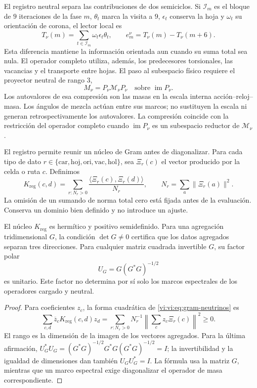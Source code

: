 El registro neutral separa las contribuciones de dos semiciclos. Si
\(\mathcal I_m\) es el bloque de \(9\) iteraciones de la fase \(m\),
\(\theta_t\) marca la visita a \(9\), \(\epsilon_t\) conserva la hoja
y \(\omega_t\) su orientación de corona, el lector local es
\[
 T_\nu(m)=\sum_{t\in\mathcal I_m}\omega_t\epsilon_t\theta_t,
 \qquad e_m^\nu=T_\nu(m)-T_\nu(m+6).
\]
Esta diferencia mantiene la información orientada aun cuando su suma
total sea nula. El operador completo utiliza, además, los predecesores
torsionales, las vacancias y el transporte entre hojas. El paso al
subespacio físico requiere el proyector neutral de rango \(3\),
\[
 M_\nu=P_\nu\mathcal M_\nu P_\nu
 \quad\text{sobre }\operatorname{im}P_\nu.
\]
Los autovalores de esa compresión son las masas en la escala interna
acción--reloj--masa. Los ángulos de mezcla actúan entre sus marcos;
no sustituyen la escala ni generan retrospectivamente los autovalores.
La compresión coincide con la restricción del operador completo cuando
\(\operatorname{im}P_\nu\) es un subespacio reductor de
\(\mathcal M_\nu\).

El registro permite reunir un núcleo de Gram antes de diagonalizar.
Para cada tipo de dato
\(r\in\{\mathrm{car},\mathrm{hoj},\mathrm{ori},\mathrm{vac},\mathrm{hol}\}\),
sea \(\Xi_r(c)\) el vector producido por la celda o ruta \(c\).
Definimos
\begin{equation}
 K_{\mathrm{reg}}(c,d)=
 \sum_{r:N_r>0}\frac{\langle\Xi_r(c),\Xi_r(d)\rangle}{N_r},
 \qquad N_r=\sum_a\|\Xi_r(a)\|^2.
 \label{vi:vi:eq:gram-neutrinos}
\end{equation}
La omisión de un sumando de norma total cero está fijada antes de la
evaluación. Conserva un dominio bien definido y no introduce un ajuste.

\begin{proposition}
\label{vi:vi:prop:gram-neutrinos}
El núcleo \(K_{\mathrm{reg}}\) es hermítico y positivo semidefinido.
Para una agregación tridimensional \(G\), la condición \(\det G\ne0\)
certifica que los datos agregados separan tres direcciones. Para cualquier
matriz cuadrada invertible \(G\), su factor polar
\[
 U_G=G(G^*G)^{-1/2}
\]
es unitario. Este factor no determina por sí solo los marcos espectrales
de los operadores cargado y neutral.
\end{proposition}
\begin{proof}
Para coeficientes \(z_c\), la forma cuadrática de
\eqref{vi:vi:eq:gram-neutrinos} es
\[
 \sum_{c,d}\overline z_cK_{\mathrm{reg}}(c,d)z_d
 =\sum_{r:N_r>0}N_r^{-1}
 \left\|\sum_c z_c\Xi_r(c)\right\|^2\ge0.
\]
El rango es la dimensión de la imagen de los vectores agregados. Para la
última afirmación,
\(U_G^*U_G=(G^*G)^{-1/2}G^*G(G^*G)^{-1/2}=I\);
la invertibilidad y la igualdad de dimensiones dan también \(U_GU_G^*=I\).
La fórmula usa la matriz \(G\), mientras que un marco espectral exige
diagonalizar el operador de masa correspondiente.
\end{proof}

